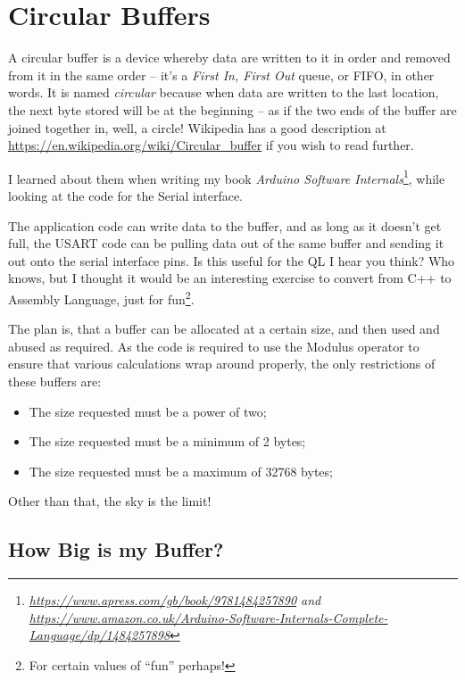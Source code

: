 \chapter{Circular Buffers}

A circular buffer is a device whereby data are written to it in order
and removed from it in the same order -- it's a \emph{First In, First
Out} queue, or FIFO, in other words. It is named \emph{circular} because
when data are written to the last location, the next byte stored will
be at the beginning -- as if the two ends of the buffer are joined
together in, well, a circle! Wikipedia has a good description at \href{https://en.wikipedia.org/wiki/Circular_buffer}{https://en.wikipedia.org/wiki/Circular\_buffer}
if you wish to read further.

I learned about them when writing my book \emph{Arduino Software Internals}\footnote{\emph{\href{https://www.apress.com/gb/book/9781484257890}{https://www.apress.com/gb/book/9781484257890}
and \href{https://www.amazon.co.uk/Arduino-Software-Internals-Complete-Language/dp/1484257898}{https://www.amazon.co.uk/Arduino-Software-Internals-Complete-Language/dp/1484257898}}}, while looking at the code for the Serial interface. 

The application code can write data to the buffer, and as long as
it doesn't get full, the USART code can be pulling data out of the
same buffer and sending it out onto the serial interface pins. Is
this useful for the QL I hear you think? Who knows, but I thought
it would be an interesting exercise to convert from C++ to Assembly
Language, just for fun\footnote{For certain values of ``fun'' perhaps!}. 

The plan is, that a buffer can be allocated at a certain size, and
then used and abused as required. As the code is required to use the
Modulus operator to ensure that various calculations wrap around properly,
the only restrictions of these buffers are:
\begin{itemize}
\item The size requested must be a power of two;
\item The size requested must be a minimum of 2 bytes;
\item The size requested must be a maximum of 32768 bytes;
\end{itemize}
Other than that, the sky is the limit!

\section{How Big is my Buffer?}

